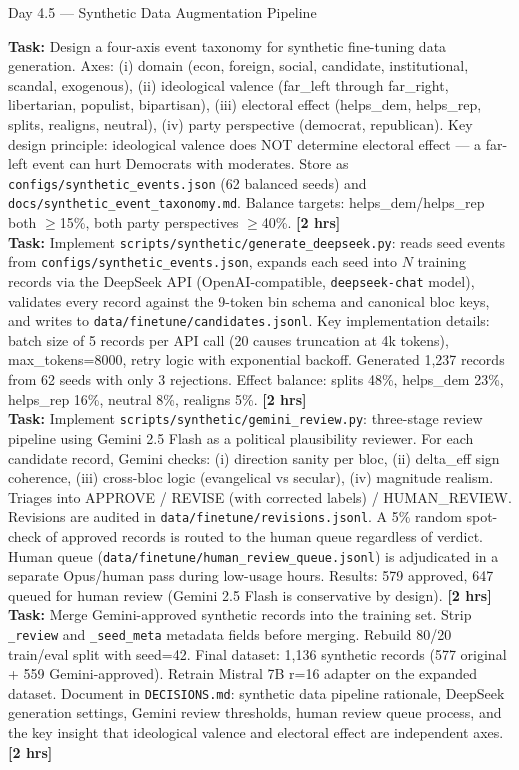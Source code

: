 \documentclass[11pt]{article}
\newcommand{\hrs}[1]{\textbf{[#1 hrs]}}
\newcommand{\task}[2]{%
  \noindent\textbf{Task:} #1 \hfill \hrs{#2}\\}
\begin{document}
\begin{taskbox}{Day 4.5 --- Synthetic Data Augmentation Pipeline}

\task{Design a four-axis event taxonomy for synthetic fine-tuning data
  generation. Axes: (i) domain (econ, foreign, social, candidate,
  institutional, scandal, exogenous), (ii) ideological valence
  (far\_left through far\_right, libertarian, populist, bipartisan),
  (iii) electoral effect (helps\_dem, helps\_rep, splits, realigns, neutral),
  (iv) party perspective (democrat, republican). Key design principle:
  ideological valence does NOT determine electoral effect --- a far-left event
  can hurt Democrats with moderates. Store as
  \texttt{configs/synthetic\_events.json} (62 balanced seeds) and
  \texttt{docs/synthetic\_event\_taxonomy.md}. Balance targets:
  helps\_dem/helps\_rep both $\geq$15\%, both party perspectives $\geq$40\%.}{2}

\task{Implement \texttt{scripts/synthetic/generate\_deepseek.py}:
  reads seed events from \texttt{configs/synthetic\_events.json},
  expands each seed into $N$ training records via the DeepSeek API
  (OpenAI-compatible, \texttt{deepseek-chat} model), validates every
  record against the 9-token bin schema and canonical bloc keys, and
  writes to \texttt{data/finetune/candidates.jsonl}. Key implementation
  details: batch size of 5 records per API call (20 causes truncation at
  4k tokens), max\_tokens=8000, retry logic with exponential backoff.
  Generated 1,237 records from 62 seeds with only 3 rejections. Effect
  balance: splits 48\%, helps\_dem 23\%, helps\_rep 16\%, neutral 8\%,
  realigns 5\%.}{2}

\task{Implement \texttt{scripts/synthetic/gemini\_review.py}:
  three-stage review pipeline using Gemini 2.5 Flash as a political
  plausibility reviewer. For each candidate record, Gemini checks:
  (i) direction sanity per bloc, (ii) delta\_eff sign coherence,
  (iii) cross-bloc logic (evangelical vs secular), (iv) magnitude
  realism. Triages into APPROVE / REVISE (with corrected labels) /
  HUMAN\_REVIEW. Revisions are audited in \texttt{data/finetune/revisions.jsonl}.
  A 5\% random spot-check of approved records is routed to the human
  queue regardless of verdict. Human queue
  (\texttt{data/finetune/human\_review\_queue.jsonl}) is adjudicated
  in a separate Opus/human pass during low-usage hours.
  Results: 579 approved, 647 queued for human review (Gemini 2.5
  Flash is conservative by design).}{2}

\task{Merge Gemini-approved synthetic records into the training set.
  Strip \texttt{\_review} and \texttt{\_seed\_meta} metadata fields
  before merging. Rebuild 80/20 train/eval split with seed=42.
  Final dataset: 1,136 synthetic records (577 original + 559
  Gemini-approved). Retrain Mistral 7B r=16 adapter on the expanded
  dataset. Document in \texttt{DECISIONS.md}: synthetic data pipeline
  rationale, DeepSeek generation settings, Gemini review thresholds,
  human review queue process, and the key insight that ideological
  valence and electoral effect are independent axes.}{2}


\end{taskbox}
\end{document}
